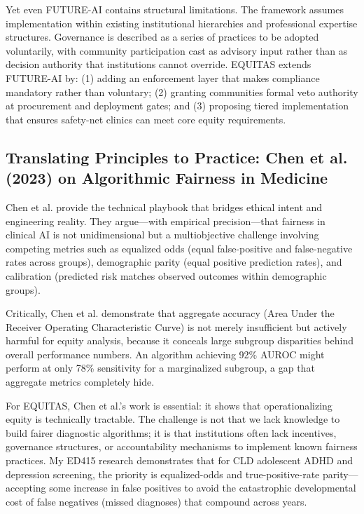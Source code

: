 \documentclass[12pt,a4paper]{article}
\begin{document}
Yet even FUTURE-AI contains structural limitations. The framework assumes implementation within existing institutional hierarchies and professional expertise structures. Governance is described as a series of practices to be adopted voluntarily, with community participation cast as advisory input rather than as decision authority that institutions cannot override.\cite{lekadir2025} EQUITAS extends FUTURE-AI by: (1) adding an enforcement layer that makes compliance mandatory rather than voluntary; (2) granting communities formal veto authority at procurement and deployment gates; and (3) proposing tiered implementation that ensures safety-net clinics can meet core equity requirements.\cite{lekadir2025}

\subsection{Translating Principles to Practice: Chen et al. (2023) on Algorithmic Fairness in Medicine}

Chen et al. provide the technical playbook that bridges ethical intent and engineering reality. They argue—with empirical precision—that fairness in clinical AI is not unidimensional but a multiobjective challenge involving competing metrics such as equalized odds (equal false-positive and false-negative rates across groups), demographic parity (equal positive prediction rates), and calibration (predicted risk matches observed outcomes within demographic groups).\cite{chen2023}

Critically, Chen et al. demonstrate that aggregate accuracy (Area Under the Receiver Operating Characteristic Curve) is not merely insufficient but actively harmful for equity analysis, because it conceals large subgroup disparities behind overall performance numbers.\cite{chen2023} An algorithm achieving 92\% AUROC might perform at only 78\% sensitivity for a marginalized subgroup, a gap that aggregate metrics completely hide.\cite{chen2023}

For EQUITAS, Chen et al.'s work is essential: it shows that operationalizing equity is technically tractable. The challenge is not that we lack knowledge to build fairer diagnostic algorithms; it is that institutions often lack incentives, governance structures, or accountability mechanisms to implement known fairness practices.\cite{chen2023} My ED415 research demonstrates that for CLD adolescent ADHD and depression screening, the priority is equalized-odds and true-positive-rate parity—accepting some increase in false positives to avoid the catastrophic developmental cost of false negatives (missed diagnoses) that compound across years.\cite{garcia_ed415}
\end{document}
